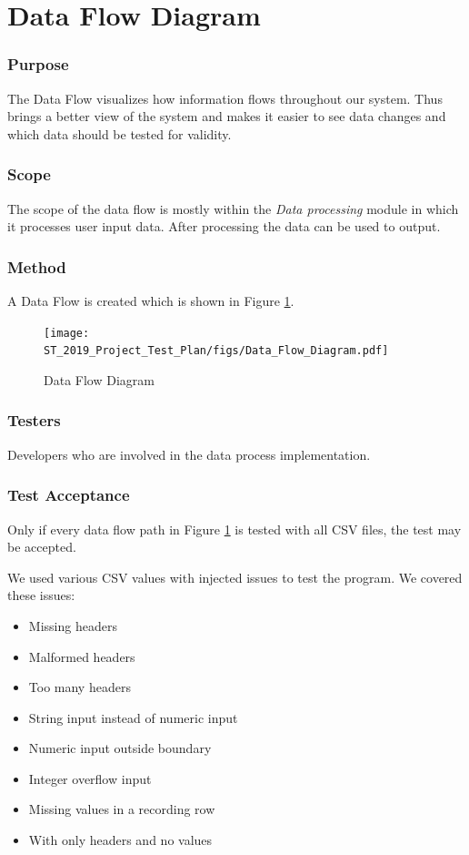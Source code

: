 \documentclass[a4paper]{article}
\begin{document}
\clearpage
\section{Data Flow Diagram}
\subsubsection*{Purpose}
The Data Flow visualizes how information flows throughout our system. Thus brings a better view of the system and makes it easier to see data changes and which data should be tested for validity.   
\subsubsection*{Scope}
The scope of the data flow is mostly within the \textit{Data processing} module in which it processes user input data. After processing the data can be used to output.
\subsubsection*{Method}
A Data Flow is created which is shown in Figure \ref{fig:dataflow}. 
\begin{figure}[H]
    \centering
    \texttt{[image: ST\_2019\_Project\_Test\_Plan/figs/Data\_Flow\_Diagram.pdf]}
    \caption{Data Flow Diagram}
    \label{fig:dataflow}
\end{figure}
\subsubsection*{Testers}
Developers who are involved in the data process implementation.
\subsubsection*{Test Acceptance}
Only if every data flow path in Figure \ref{fig:dataflow} is tested with all CSV files, the test may be accepted.

We used various CSV values with injected issues to test the program. We covered these issues:
\begin{itemize}
    \item Missing headers
    \item Malformed headers
    \item Too many headers
    \item String input instead of numeric input
    \item Numeric input outside boundary
    \item Integer overflow input
    \item Missing values in a recording row
    \item With only headers and no values
\end{itemize}
\end{document}
